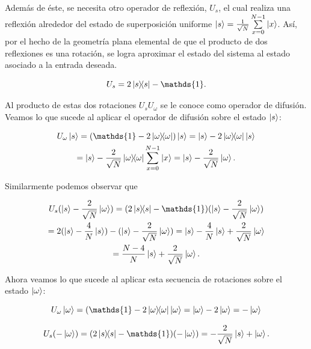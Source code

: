 Además de éste, se necesita otro operador de reflexión, $U_s$, el cual realiza una reflexión alrededor del estado de superposición uniforme $\ket{s} = \frac{1}{\sqrt{N}} \sum\limits_{x=0}^{N-1} \ket{x}$. Así, por el hecho de la geometría plana elemental de que el producto de dos reflexiones es una rotación, se logra aproximar el estado del sistema al estado asociado a la entrada deseada.

\begin{equation}
U_s = 2 \ketbra{s}{s} - \mathds{1} .
\end{equation}

Al producto de estas dos rotaciones $U_s U_\omega$ se le conoce como operador de difusión. Veamos lo que sucede al aplicar el operador de difusión sobre el estado $\ket{s}$:

\begin{multline}
    U_\omega \ket{s}
    = (\mathds{1} - 2 \ketbra{\omega}{\omega}) \ket{s}
    = \ket{s} - 2 \ketbra{\omega}{\omega} \ket{s} \\
    = \ket{s} - \frac{2}{\sqrt{N}} \ketbra{\omega}{\omega} \sum\limits_{x=0}^{N-1} \ket{x}
    = \ket{s} - \frac{2}{\sqrt{N}} \ket{\omega} .
\end{multline}

Similarmente podemos observar que

\begin{multline}
    U_s (\ket{s} - \frac{2}{\sqrt{N}} \ket{\omega})
    = (2 \ketbra{s}{s} - \mathds{1}) (\ket{s} - \frac{2}{\sqrt{N}} \ket{\omega}) \\
    = 2 (\ket{s} - \frac{4}{N} \ket{s}) - (\ket{s} - \frac{2}{\sqrt{N}} \ket{\omega})
    = \ket{s} - \frac{4}{N} \ket{s} + \frac{2}{\sqrt{N}} \ket{\omega} \\
    = \frac{N-4}{N} \ket{s} + \frac{2}{\sqrt{N}} \ket{\omega} .
\end{multline}

Ahora veamos lo que sucede al aplicar esta secuencia de rotaciones sobre el estado $\ket{\omega}$:

\begin{equation}
    U_\omega \ket{\omega}
    = (\mathds{1} - 2 \ketbra{\omega}{\omega} \ket{\omega}
    = \ket{\omega} - 2 \ket{\omega}
    = - \ket{\omega}
\end{equation}

\begin{equation}
    U_s (-\ket{\omega})
    = (2 \ketbra{s}{s} - \mathds{1}) (-\ket{\omega})
    = -\frac{2}{\sqrt{N}} \ket{s} + \ket{\omega} .
\end{equation}

